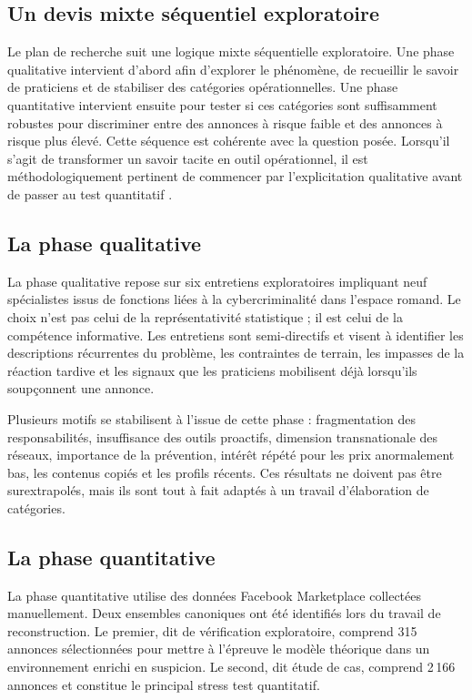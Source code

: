 \documentclass[10pt,a4paper]{article}
\begin{document}
\subsection{Un devis mixte séquentiel exploratoire}
Le plan de recherche suit une logique mixte séquentielle exploratoire. Une phase qualitative intervient d'abord afin d'explorer le phénomène, de recueillir le savoir de praticiens et de stabiliser des catégories opérationnelles. Une phase quantitative intervient ensuite pour tester si ces catégories sont suffisamment robustes pour discriminer entre des annonces à risque faible et des annonces à risque plus élevé. Cette séquence est cohérente avec la question posée. Lorsqu'il s'agit de transformer un savoir tacite en outil opérationnel, il est méthodologiquement pertinent de commencer par l'explicitation qualitative avant de passer au test quantitatif \cite{fortin2022,thomas2006}.

\subsection{La phase qualitative}
La phase qualitative repose sur six entretiens exploratoires impliquant neuf spécialistes issus de fonctions liées à la cybercriminalité dans l'espace romand. Le choix n'est pas celui de la représentativité statistique ; il est celui de la compétence informative. Les entretiens sont semi-directifs et visent à identifier les descriptions récurrentes du problème, les contraintes de terrain, les impasses de la réaction tardive et les signaux que les praticiens mobilisent déjà lorsqu'ils soupçonnent une annonce.

Plusieurs motifs se stabilisent à l'issue de cette phase : fragmentation des responsabilités, insuffisance des outils proactifs, dimension transnationale des réseaux, importance de la prévention, intérêt répété pour les prix anormalement bas, les contenus copiés et les profils récents. Ces résultats ne doivent pas être surextrapolés, mais ils sont tout à fait adaptés à un travail d'élaboration de catégories.

\subsection{La phase quantitative}
La phase quantitative utilise des données Facebook Marketplace collectées manuellement. Deux ensembles canoniques ont été identifiés lors du travail de reconstruction. Le premier, dit de vérification exploratoire, comprend 315 annonces sélectionnées pour mettre à l'épreuve le modèle théorique dans un environnement enrichi en suspicion. Le second, dit étude de cas, comprend 2\,166 annonces et constitue le principal stress test quantitatif.
\end{document}
